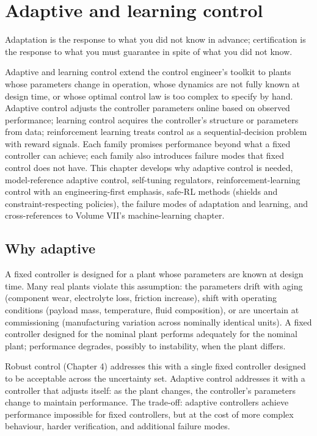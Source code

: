 \chapter{Adaptive and learning control}
\label{vol09:ch05}

\epigraph{Adaptation is the response to what you did not know in advance; certification is the response to what you must guarantee in spite of what you did not know.}{}


\noindent
Adaptive and learning control extend the control engineer's toolkit to plants whose parameters change in operation, whose dynamics are not fully known at design time, or whose optimal control law is too complex to specify by hand. Adaptive control adjusts the controller parameters online based on observed performance; learning control acquires the controller's structure or parameters from data; reinforcement learning treats control as a sequential-decision problem with reward signals. Each family promises performance beyond what a fixed controller can achieve; each family also introduces failure modes that fixed control does not have. This chapter develops why adaptive control is needed, model-reference adaptive control, self-tuning regulators, reinforcement-learning control with an engineering-first emphasis, safe-RL methods (shields and constraint-respecting policies), the failure modes of adaptation and learning, and cross-references to Volume VII's machine-learning chapter.

\section{Why adaptive}

A fixed controller is designed for a plant whose parameters are known at design time. Many real plants violate this assumption: the parameters drift with aging (component wear, electrolyte loss, friction increase), shift with operating conditions (payload mass, temperature, fluid composition), or are uncertain at commissioning (manufacturing variation across nominally identical units). A fixed controller designed for the nominal plant performs adequately for the nominal plant; performance degrades, possibly to instability, when the plant differs.

Robust control (Chapter 4) addresses this with a single fixed controller designed to be acceptable across the uncertainty set. Adaptive control addresses it with a controller that adjusts itself: as the plant changes, the controller's parameters change to maintain performance. The trade-off: adaptive controllers achieve performance impossible for fixed controllers, but at the cost of more complex behaviour, harder verification, and additional failure modes.

